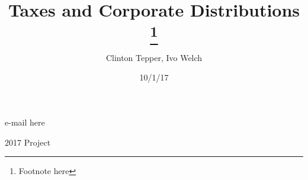 \documentclass[9pt,english]{extarticle}
\numberwithin{equation}{section}
\numberwithin{figure}{section}
\newcommand{\lyxaddress}[1]{
\par {\raggedright #1
\vspace{1.4em}
\noindent\par}
}
\begin{document}
\title{Taxes and Corporate Distributions \thanks{Footnote here }}

\author{Clinton Tepper, Ivo Welch}

\date{10/1/17}
\maketitle

\lyxaddress{\begin{center}
e-mail here
\par\end{center}}

\lyxaddress{\begin{center}
2017 Project
\par\end{center}}

\thispagestyle{empty}

\pagebreak{}

\setcounter{page}{1}
\end{document}
